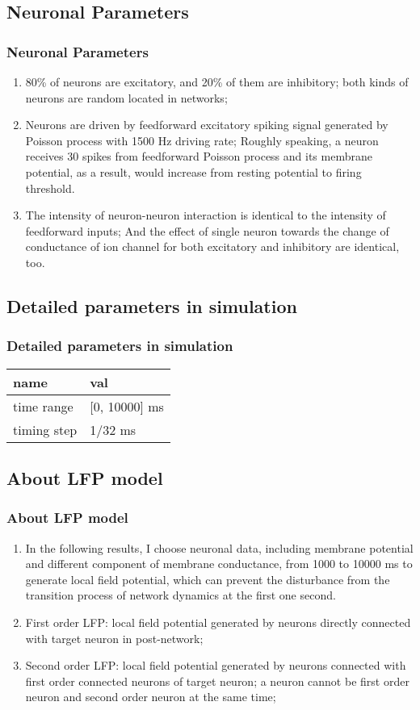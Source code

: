 \documentclass{beamer}
\begin{document}
	\subsection{Neuronal Parameters}
	\begin{frame}
		\frametitle{Neuronal Parameters}
		\begin{enumerate}
			\item 80\% of neurons are excitatory, and 20\% of them are inhibitory; both kinds of neurons are random located in networks;
			\item Neurons are driven by feedforward excitatory spiking signal generated by Poisson process with 1500 Hz driving rate; Roughly speaking, a neuron receives 30 spikes from feedforward Poisson process and its membrane potential, as a result, would increase from resting potential to firing threshold.
			\item The intensity of neuron-neuron interaction is identical to the intensity of feedforward inputs; And the effect of single neuron towards the change of conductance of ion channel for both excitatory and inhibitory are identical, too.
		\end{enumerate}
	\end{frame}
	\subsection{Detailed parameters in simulation}
	\begin{frame}
		\frametitle{Detailed parameters in simulation}
		\begin{tabular}{l l}
			\hline
			name & val \\
			\hline
			time range & [0, 10000] ms \\
			timing step & 1/32 ms \\
			\hline
		\end{tabular}	
	\end{frame}
	\subsection{About LFP model}
	\begin{frame}
	\frametitle{About LFP model}
		\begin{enumerate}[*]
			\item In the following results, I choose neuronal data, including membrane potential and different component of membrane conductance, from 1000 to 10000 ms to generate local field potential, which can prevent the disturbance from the transition process of network dynamics at the first one second.
			\item First order LFP: local field potential generated by neurons directly connected with target neuron in post-network;
			\item Second order LFP: local field potential generated by neurons connected with first order connected neurons of target neuron; a neuron cannot be first order neuron and second order neuron at the same time;
		\end{enumerate}
	\end{frame}
\end{document}
